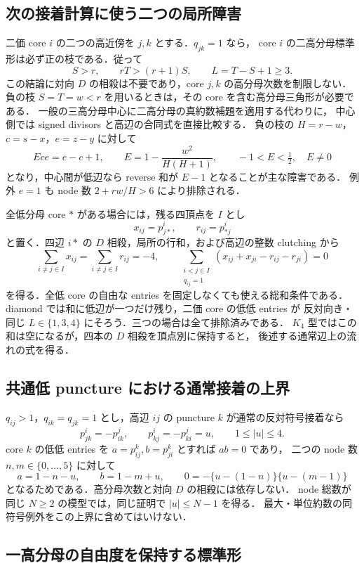 \subsection{次の接着計算に使う二つの局所障害}
\label{ng16:local-obstructions}

二価 core $i$ の二つの高近傍を $j,k$ とする．$q_{jk}=1$ なら，
core $i$ の二高分母標準形は必ず正の枝である．従って
\[
 S>r,\qquad rT>(r+1)S,\qquad L=T-S+1\geq3.
\]
この結論に対向 $D$ の相殺は不要であり，core $j,k$ の高分母次数を制限しない．
負の枝 $S=T=w<r$ を用いるときは，その core を含む高分母三角形が必要である．
一般の三高分母中心に二高分母の真約数補題を適用する代わりに，
中心側では signed divisors と高辺の合同式を直接比較する．
負の枝の $H=r-w$，$c=s-x$，$e=z-y$ に対して
\[
 Ece=e-c+1,\qquad E=1-\frac{w^2}{H(H+1)},
 \qquad -1<E<\tfrac12,\quad E\ne0
\]
となり，中心間が低辺なら reverse 和が $E-1$ となることが主な障害である．
例外 $e=1$ も node 数 $2+rw/H>6$ により排除される．

全低分母 core $*$ がある場合には，残る四頂点を $I$ とし
\[
 x_{ij}=p^i_{j*},\qquad r_{ij}=p^i_{*j}
\]
と置く．四辺 $i*$ の $D$ 相殺，局所の行和，および高辺の整数 clutching から
\[
 \sum_{i\ne j\in I}x_{ij}=\sum_{i\ne j\in I}r_{ij}=-4,
 \qquad
 \sum_{\substack{i<j\in I\\q_{ij}=1}}
 (x_{ij}+x_{ji}-r_{ij}-r_{ji})=0
\]
を得る．全低 core の自由な entries を固定しなくても使える総和条件である．
diamond では和に低辺が一つだけ残り，二価 core の低低 entries が
反対向き・同じ $L\in\{1,3,4\}$ にそろう．三つの場合は全て排除済みである．
$K_4$ 型ではこの和は空になるが，四本の $D$ 相殺を頂点別に保持すると，
後述する通常辺上の流れの式を得る．


\subsection{共通低 puncture における通常接着の上界}
\label{ng16:ordinary-bound}

$q_{ij}>1$，$q_{ik}=q_{jk}=1$ とし，高辺 $ij$ の puncture $k$ が通常の反対符号接着なら
\[
 p^i_{jk}=-p^j_{ik},\qquad p^i_{kj}=-p^j_{ki}=u,\qquad1\le |u|\le4.
\]
core $k$ の低低 entries を $a=p^k_{ij},b=p^k_{ji}$ とすれば $ab=0$ であり，
二つの node 数 $n,m\in\{0,\ldots,5\}$ に対して
\[
 a=1-n-u,\qquad b=1-m+u,\qquad
 0=-\{u-(1-n)\}\{u-(m-1)\}
\]
となるためである．高分母次数と対向 $D$ の相殺には依存しない．
node 総数が同じ $N\ge2$ の模型では，同じ証明で $|u|\le N-1$ を得る．
最大・単位約数の同符号例外をこの上界に含めてはいけない．

\subsection{一高分母の自由度を保持する標準形}
\label{ng16:leaf-data}

